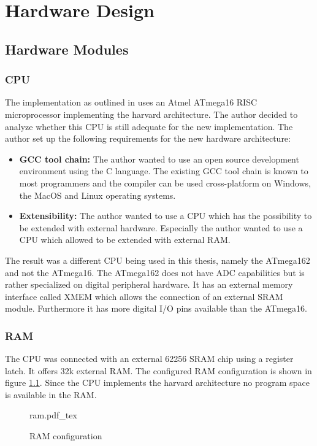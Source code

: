 \chapter{Hardware Design}%
\section{Hardware Modules}%
\subsection{CPU} %
\label{sub:cpu}
The implementation as outlined in \cite{korniowski} uses an Atmel ATmega16 RISC microprocessor implementing the harvard architecture. The author decided to analyze whether this CPU is still adequate for the new implementation. The author set up the following requirements for the new hardware architecture:

\begin{itemize}
    \item \textbf{GCC tool chain:} The author wanted to use an open source development environment using the C language. The existing GCC tool chain is known to most programmers and the compiler can be used cross-platform on Windows, the MacOS and Linux operating systems.
    \item \textbf{Extensibility:} The author wanted to use a CPU which has the possibility to be extended with external hardware. Especially the author wanted to use a CPU which allowed to be extended with external RAM.
\end{itemize}

The result was a different CPU being used in this thesis, namely the ATmega162 and not the ATmega16. The ATmega162 does not have ADC capabilities but is rather specialized on digital peripheral hardware. It has an external memory interface called XMEM which allows the connection of an external SRAM module. Furthermore it has more digital I/O pins available than the ATmega16.

\subsection{RAM}%
The CPU was connected with an external 62256 SRAM \cite{62256-datasheet} chip using a register latch. It offers 32k external RAM. The configured RAM configuration is shown in figure \ref{fig:ram}. Since the CPU implements the harvard architecture no program space is available in the RAM.

\begin{figure}[H]
\centering
{ram.pdf_tex}
\caption{RAM configuration}
\label{fig:ram}
\end{figure}

